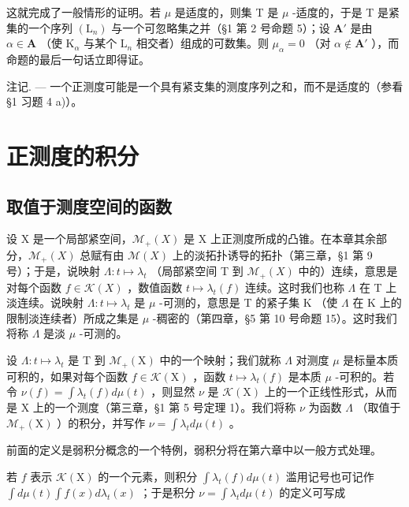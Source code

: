这就完成了一般情形的证明。若 \(\mu\) 是适度的，则集 T 是 \(\mu\) -适度的，于是 T 是紧集的一个序列 \((\mathrm{L}_n)\) 与一个可忽略集之并（§1 第 2 号命题 5）；设 \(\mathbf{A}'\) 是由 \(\alpha \in \mathbf{A}\) （使 \(\mathrm{K}_{\alpha}\) 与某个 \(\mathrm{L}_n\) 相交者）组成的可数集。则 \(\mu_{\alpha} = 0\) （对 \(\alpha \notin \mathbf{A}'\) ），而命题的最后一句话立即得证。

注记. --- 一个正测度可能是一个具有紧支集的测度序列之和，而不是适度的（参看 §1 习题 4 a)）。

\section{正测度的积分}

\subsection{取值于测度空间的函数}

设 X 是一个局部紧空间，\(\mathcal{M}_{+}(X)\) 是 X 上正测度所成的凸锥。在本章其余部分，\(\mathcal{M}_{+}(X)\) 总赋有由 \(\mathcal{M}(X)\) 上的淡拓扑诱导的拓扑（第三章，§1 第 9 号）；于是，说映射 \(\Lambda: t \mapsto \lambda_{t}\) （局部紧空间 T 到 \(\mathcal{M}_{+}(X)\) 中的）连续，意思是对每个函数 \(f \in \mathcal{K}(X)\) ，数值函数 \(t \mapsto \lambda_{t}(f)\) 连续。这时我们也称 \(\Lambda\) 在 T 上淡连续。说映射 \(\Lambda: t \mapsto \lambda_{t}\) 是 \(\mu\) -可测的，意思是 T 的紧子集 K （使 \(\Lambda\) 在 K 上的限制淡连续者）所成之集是 \(\mu\) -稠密的（第四章，§5 第 10 号命题 15）。这时我们将称 \(\Lambda\) 是淡 \(\mu\) -可测的。

设 \(\Lambda : t \mapsto \lambda_t\) 是 T 到 \(\mathcal{M}_+(\mathrm{X})\) 中的一个映射；我们就称 \(\Lambda\) 对测度 \(\mu\) 是标量本质可积的，如果对每个函数 \(f \in \mathcal{K}(\mathrm{X})\) ，函数 \(t \mapsto \lambda_t(f)\) 是本质 \(\mu\) -可积的。若令 \(\nu(f) = \int \lambda_t(f) d\mu(t)\) ，则显然 \(\nu\) 是 \(\mathcal{K}(\mathrm{X})\) 上的一个正线性形式，从而是 X 上的一个测度（第三章，§1 第 5 号定理 1）。我们将称 \(\nu\) 为函数 \(\Lambda\) （取值于 \(\mathcal{M}_+(\mathrm{X})\) ）的积分，并写作 \(\nu = \int \lambda_t d\mu(t)\) 。

前面的定义是弱积分概念的一个特例，弱积分将在第六章中以一般方式处理。

若 \(f\) 表示 \(\mathcal{K}(\mathrm{X})\) 的一个元素，则积分 \(\int \lambda_t(f) d\mu(t)\) 滥用记号也可记作 \(\int d\mu(t) \int f(x) d\lambda_t(x)\) ；于是积分 \(\nu = \int \lambda_t d\mu(t)\) 的定义可写成

